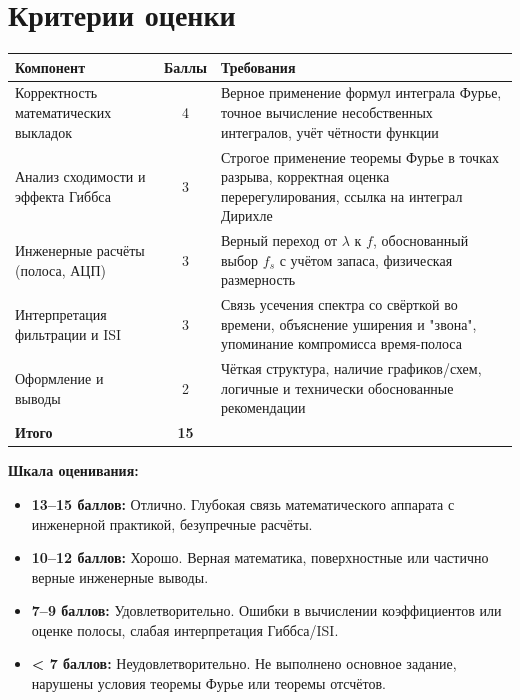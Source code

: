 \documentclass[12pt,a4paper]{article}
\begin{document}
\section{Критерии оценки}
\begin{table}[h!]
\centering
\renewcommand{\arraystretch}{1.3}
\begin{tabularx}{\textwidth}{|l|c|X|}
\hline
\textbf{Компонент} & \textbf{Баллы} & \textbf{Требования} \\ \hline
Корректность математических выкладок & 4 & Верное применение формул интеграла Фурье, точное вычисление несобственных интегралов, учёт чётности функции \\ \hline
Анализ сходимости и эффекта Гиббса & 3 & Строгое применение теоремы Фурье в точках разрыва, корректная оценка перерегулирования, ссылка на интеграл Дирихле \\ \hline
Инженерные расчёты (полоса, АЦП) & 3 & Верный переход от $\lambda$ к $f$, обоснованный выбор $f_s$ с учётом запаса, физическая размерность \\ \hline
Интерпретация фильтрации и ISI & 3 & Связь усечения спектра со свёрткой во времени, объяснение уширения и "звона", упоминание компромисса время-полоса \\ \hline
Оформление и выводы & 2 & Чёткая структура, наличие графиков/схем, логичные и технически обоснованные рекомендации \\ \hline
\textbf{Итого} & \textbf{15} & \\ \hline
\end{tabularx}
\end{table}

\textbf{Шкала оценивания:}
\begin{itemize}
    \item[$\bullet$] \textbf{13--15 баллов:} Отлично. Глубокая связь математического аппарата с инженерной практикой, безупречные расчёты.
    \item[$\bullet$] \textbf{10--12 баллов:} Хорошо. Верная математика, поверхностные или частично верные инженерные выводы.
    \item[$\bullet$] \textbf{7--9 баллов:} Удовлетворительно. Ошибки в вычислении коэффициентов или оценке полосы, слабая интерпретация Гиббса/ISI.
    \item[$\bullet$] \textbf{< 7 баллов:} Неудовлетворительно. Не выполнено основное задание, нарушены условия теоремы Фурье или теоремы отсчётов.
\end{itemize}
\end{document}
